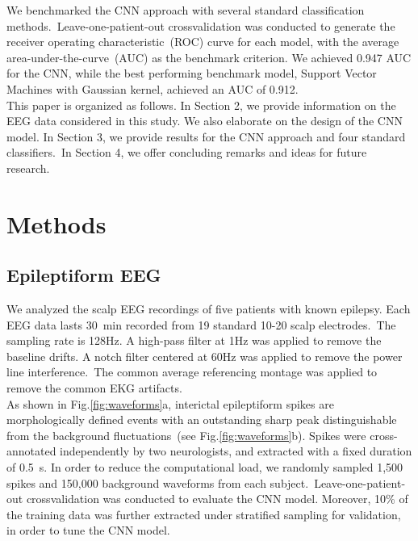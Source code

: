 \documentclass{article}
\begin{document}
We benchmarked the CNN approach with several standard classification methods.~Leave-one-patient-out crossvalidation was conducted to generate the receiver operating characteristic~(ROC) curve for each model, with the average area-under-the-curve~(AUC) as the benchmark criterion. We achieved 0.947 AUC for the CNN, while the best performing benchmark model, Support Vector Machines with Gaussian kernel, achieved an AUC of 0.912.
\\

This paper is organized as follows. In Section 2, we provide information on the EEG data considered in this study. We also elaborate on the design of the CNN model. In Section 3, we provide results for the CNN approach and four standard classifiers.~In Section 4, we offer concluding remarks and ideas for future research. \\

\section{Methods}
\subsection{Epileptiform EEG}
We analyzed the scalp EEG recordings of five patients with known epilepsy. Each EEG data lasts 30~min recorded from 19 standard 10-20 scalp electrodes.~The sampling rate is 128Hz. A high-pass filter at 1Hz was applied to remove the baseline drifts. A notch filter centered at 60Hz was applied to remove the power line interference.~The common average referencing montage was applied to remove the common EKG artifacts.\\

As shown in Fig.\ref{fig:waveforms}a, interictal epileptiform spikes are morphologically defined events with an outstanding sharp peak distinguishable from the background fluctuations~(see Fig.\ref{fig:waveforms}b). Spikes were cross-annotated independently by two neurologists, and extracted with a fixed duration of 0.5~s. In order to reduce the computational load, we randomly sampled 1,500 spikes and 150,000 background waveforms from each subject.~Leave-one-patient-out crossvalidation was conducted to evaluate the CNN model. Moreover, 10\% of the training data was further extracted under stratified sampling for validation, in order to tune the CNN model.\\
\end{document}
